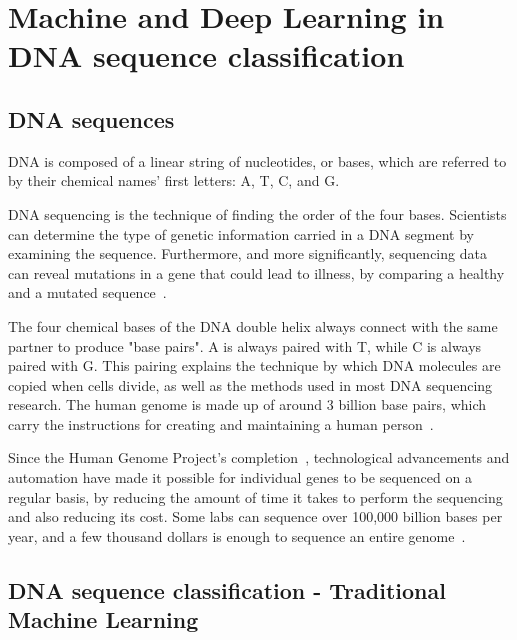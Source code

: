 \chapter{Machine and Deep Learning in DNA sequence classification} \label{chap:dna_sequences}

\section{DNA sequences} \label{subsec:what_are_dna_sequences}

\gls{DNA} is composed of a linear string of nucleotides, or bases, which are referred to by their chemical names' first letters: \gls{A}, \gls{T}, \gls{C}, and \gls{G}. 

\gls{DNA} sequencing is the technique of finding the order of the four bases. Scientists can determine the type of genetic information carried in a \gls{DNA} segment by examining the sequence. Furthermore, and more significantly, sequencing data can reveal mutations in a gene that could lead to illness, by comparing a healthy and a mutated sequence~\cite{2020DNASheet}.

The four chemical bases of the \gls{DNA} double helix always connect with the same partner to produce "base pairs". \gls{A} is always paired with \gls{T}, while \gls{C} is always paired with \gls{G}. This pairing explains the technique by which \gls{DNA} molecules are copied when cells divide, as well as the methods used in most \gls{DNA} sequencing research. The human \gls{genome} is made up of around 3 billion base pairs, which carry the instructions for creating and maintaining a human person~\cite{2020DNASheet}.

Since the Human Genome Project's completion~\cite{TheProject}, technological advancements and automation have made it possible for individual genes to be sequenced on a regular basis, by reducing the amount of time it takes to perform the sequencing and also reducing its cost. Some labs can sequence over 100,000 billion bases per year, and a few thousand dollars is enough to sequence an entire \gls{genome}~\cite{2020DNASheet}. 

\section{DNA sequence classification - Traditional Machine Learning}

